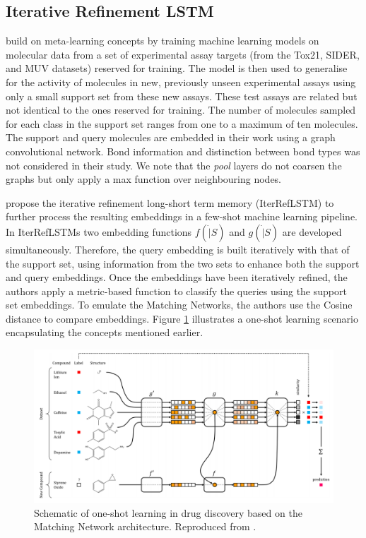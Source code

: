 \subsection{Iterative Refinement LSTM}

\citet{altae2017low} build on meta-learning concepts by training machine learning models on molecular data from a set of experimental assay targets (from the Tox21, SIDER, and MUV datasets) reserved for training. The model is then used to generalise for the activity of molecules in new, previously unseen experimental assays using only a small support set from these new assays. These test assays are related but not identical to the ones reserved for training. The number of molecules sampled for each class in the support set ranges from one to a maximum of ten molecules. The support and query molecules are embedded in their work using a graph convolutional network. Bond information and distinction between bond types was not considered in their study. We note that the \textit{pool} layers do not coarsen the graphs but only apply a max function over neighbouring nodes.

\citet{altae2017low} propose the iterative refinement long-short term memory (IterRefLSTM) to further process the resulting embeddings in a few-shot machine learning pipeline. In IterRefLSTMs two embedding functions $f(\dot|S)$ and $g(\dot|S)$ are developed simultaneously. Therefore, the query embedding is built iteratively with that of the support set, using information from the two sets to enhance both the support and query embeddings. Once the embeddings have been iteratively refined, the authors apply a metric-based function to classify the queries using the support set embeddings. To emulate the Matching Networks, the authors use the Cosine distance to compare embeddings. Figure \ref{fig:schematiconeshotdrug} illustrates a one-shot learning scenario encapsulating the concepts mentioned earlier.

\begin{figure}[h]
    \centering
    \includegraphics[width=0.9\linewidth]{img/pandeschematic.png}
    \caption[Schematic of one-shot learning in drug discovery]{Schematic of one-shot learning in drug discovery based on the Matching Network \citep{vinyals2016matching} architecture. Reproduced from \citet{altae2017low}.}
    \label{fig:schematiconeshotdrug}
\end{figure}

